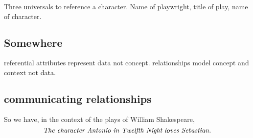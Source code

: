 Three universals to reference a character. Name of playwright, title of play, name of character.

\subsection{Somewhere}
\mynote
referential attributes represent data not concept.
\mynote
relationships model concept and context not data. 


 
\subsection{communicating relationships}
\begin{newtt}
\mynote 
So we have, in the context of the plays of William Shakespeare,
\begin{equation}
\label{AntonioLovesSebastian}
\mbox{\textit{The character Antonio in Twelfth Night loves Sebastian.}}
\end{equation} 
\end{newtt}